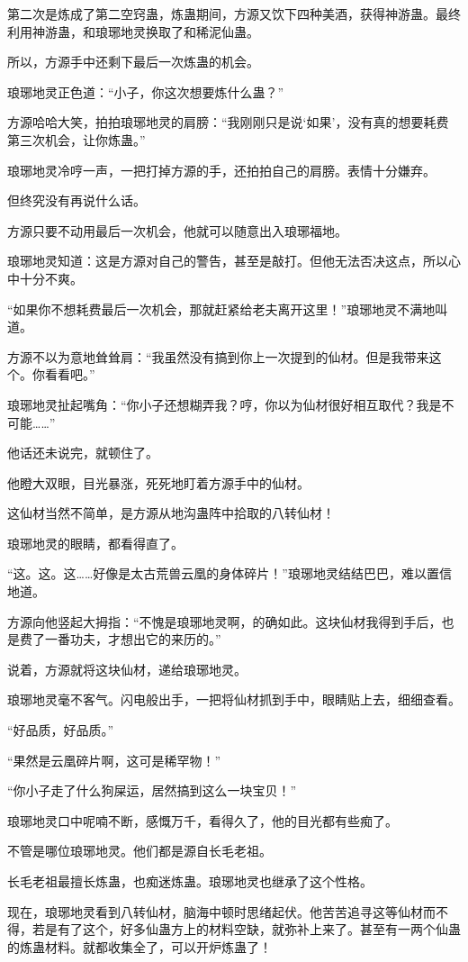 \begin{this_body}
第二次是炼成了第二空窍蛊，炼蛊期间，方源又饮下四种美酒，获得神游蛊。最终利用神游蛊，和琅琊地灵换取了和稀泥仙蛊。

所以，方源手中还剩下最后一次炼蛊的机会。

琅琊地灵正色道：“小子，你这次想要炼什么蛊？”

方源哈哈大笑，拍拍琅琊地灵的肩膀：“我刚刚只是说‘如果’，没有真的想要耗费第三次机会，让你炼蛊。”

琅琊地灵冷哼一声，一把打掉方源的手，还拍拍自己的肩膀。表情十分嫌弃。

但终究没有再说什么话。

方源只要不动用最后一次机会，他就可以随意出入琅琊福地。

琅琊地灵知道：这是方源对自己的警告，甚至是敲打。但他无法否决这点，所以心中十分不爽。

“如果你不想耗费最后一次机会，那就赶紧给老夫离开这里！”琅琊地灵不满地叫道。

方源不以为意地耸耸肩：“我虽然没有搞到你上一次提到的仙材。但是我带来这个。你看看吧。”

琅琊地灵扯起嘴角：“你小子还想糊弄我？哼，你以为仙材很好相互取代？我是不可能……”

他话还未说完，就顿住了。

他瞪大双眼，目光暴涨，死死地盯着方源手中的仙材。

这仙材当然不简单，是方源从地沟蛊阵中拾取的八转仙材！

琅琊地灵的眼睛，都看得直了。

“这。这。这……好像是太古荒兽云凰的身体碎片！”琅琊地灵结结巴巴，难以置信地道。

方源向他竖起大拇指：“不愧是琅琊地灵啊，的确如此。这块仙材我得到手后，也是费了一番功夫，才想出它的来历的。”

说着，方源就将这块仙材，递给琅琊地灵。

琅琊地灵毫不客气。闪电般出手，一把将仙材抓到手中，眼睛贴上去，细细查看。

“好品质，好品质。”

“果然是云凰碎片啊，这可是稀罕物！”

“你小子走了什么狗屎运，居然搞到这么一块宝贝！”

琅琊地灵口中呢喃不断，感慨万千，看得久了，他的目光都有些痴了。

不管是哪位琅琊地灵。他们都是源自长毛老祖。

长毛老祖最擅长炼蛊，也痴迷炼蛊。琅琊地灵也继承了这个性格。

现在，琅琊地灵看到八转仙材，脑海中顿时思绪起伏。他苦苦追寻这等仙材而不得，若是有了这个，好多仙蛊方上的材料空缺，就弥补上来了。甚至有一两个仙蛊的炼蛊材料。就都收集全了，可以开炉炼蛊了！


\end{this_body}
